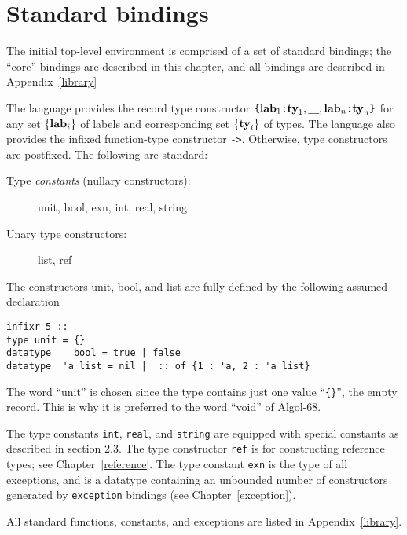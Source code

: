 \chapter{Standard bindings}
The initial top-level environment is comprised of a set of standard
bindings; the ``core'' bindings are described in this chapter, and
all bindings are described in Appendix~\ref{library}

The language provides the record type constructor 
$ \verb"{" {\bf lab}_1 \verb":" {\bf ty}_1 , \underline{\ \ \ }
 , {\bf lab}_n \verb":" {\bf ty}_n \verb"}"$ for any set 
$\{ {\bf lab}_i \} $ of labels and corresponding set 
$\{ {\bf ty}_i \} $ of types.  The language also provides the infixed
function-type constructor \verb"->".  Otherwise, type constructors
are postfixed.  The following are standard:

\begin{description}
\item[Type {\em constants} (nullary constructors):]  unit, bool, exn, int,
real, string
\item[Unary type constructors:]  list, ref
\end{description}

The constructors unit, bool, and list are fully defined by the
following assumed declaration
\begin{verbatim}
infixr 5 ::
type unit = {}
datatype    bool = true | false
datatype  'a list = nil |  :: of {1 : 'a, 2 : 'a list}
\end{verbatim}

The word ``unit'' is chosen since the type contains just one value
``\verb"{}"'', the empty record.  This is why it is preferred to the
word ``void'' of Algol-68.

The type constants \verb"int", \verb"real", and \verb"string"
are equipped with special
constants as described in section 2.3.  The type constructor
\verb"ref" is for constructing reference types; see
Chapter~\ref{reference}.
The type constant \verb"exn" is the type of all exceptions, and
is a datatype containing an unbounded number of constructors
generated by \verb"exception" bindings (see Chapter~\ref{exception}).

All standard functions, constants, and exceptions are listed in
Appendix~\ref{library}.

